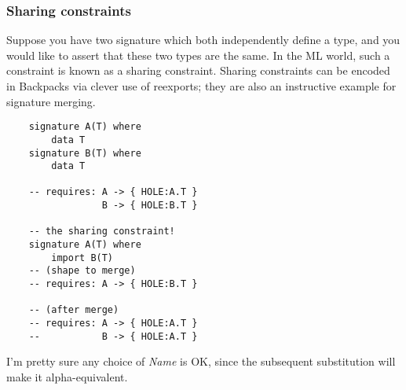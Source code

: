 \documentclass{article}
\newcommand{\Red}[1]{{\color{red} #1}}
\begin{document}
\subsubsection{Sharing constraints}

Suppose you have two signature which both independently define a type,
and you would like to assert that these two types are the same.  In the
ML world, such a constraint is known as a sharing constraint.  Sharing
constraints can be encoded in Backpacks via clever use of reexports;
they are also an instructive example for signature merging.

\begin{verbatim}
    signature A(T) where
        data T
    signature B(T) where
        data T

    -- requires: A -> { HOLE:A.T }
                 B -> { HOLE:B.T }

    -- the sharing constraint!
    signature A(T) where
        import B(T)
    -- (shape to merge)
    -- requires: A -> { HOLE:B.T }

    -- (after merge)
    -- requires: A -> { HOLE:A.T }
    --           B -> { HOLE:A.T }
\end{verbatim}
%
\Red{I'm pretty sure any choice of \textit{Name} is OK, since the
subsequent substitution will make it alpha-equivalent.}






%
%
%

\end{document}
